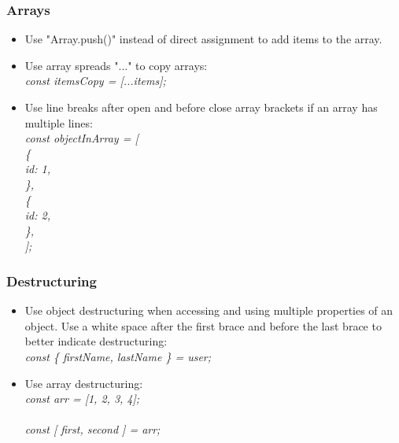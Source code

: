 \documentclass[12pt]{report}
\begin{document}
\subsubsection{Arrays}
\begin{itemize}[noitemsep]
\item Use "Array.push()" instead of direct assignment to add items to the array.
\item Use array spreads "..." to copy arrays: \\
\textit{
	\hspace*{4ex}const itemsCopy = [...items];
}
\item Use line breaks after open and before close array brackets if an array has multiple lines: \\
\textit{
	const objectInArray = [\\
    \hspace*{2ex}\{ \\
    	\hspace*{4ex}id: 1, \\
    \hspace*{2ex}\}, \\
    \hspace*{2ex}\{ \\
    	\hspace*{4ex}id: 2, \\
    \hspace*{2ex}\}, \\
    ];
}
\end{itemize}

\subsubsection{Destructuring}
\begin{itemize}[noitemsep]
\item Use object destructuring when accessing and using multiple properties of an object. Use a white space after the first brace and before the last brace to better indicate destructuring: \\
\textit{
	\hspace*{4ex}const \{ firstName, lastName \} = user;
}
\item Use array destructuring:\\
\textit{
	const arr = [1, 2, 3, 4]; \\
    \\
    const [ first, second ] = arr;
}
\end{itemize}
\end{document}
